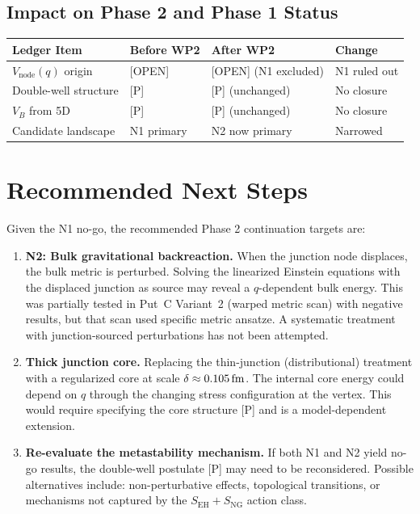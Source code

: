 \subsection{Impact on Phase 2 and Phase 1 Status}

\begin{center}
\begin{tabular}{llll}
\toprule
\textbf{Ledger Item} & \textbf{Before WP2} & \textbf{After WP2}
& \textbf{Change} \\
\midrule
$V_{\mathrm{node}}(q)$ origin & [OPEN] & [OPEN] (N1 excluded)
& N1 ruled out \\
Double-well structure & [P] & [P] (unchanged)
& No closure \\
$V_B$ from 5D & [P] & [P] (unchanged) & No closure \\
Candidate landscape & N1 primary & N2 now primary & Narrowed \\
\bottomrule
\end{tabular}
\end{center}

\section{Recommended Next Steps}
\label{sec:P2WP2:next}

Given the N1 no-go, the recommended Phase 2 continuation targets are:

\begin{enumerate}
    \item \textbf{N2: Bulk gravitational backreaction.} When the junction
          node displaces, the bulk metric is perturbed. Solving the
          linearized Einstein equations with the displaced junction as
          source may reveal a $q$-dependent bulk energy. This was
          partially tested in Put~C Variant~2 (warped metric scan) with
          negative results, but that scan used specific metric ansatze.
          A systematic treatment with junction-sourced perturbations
          has not been attempted.

    \item \textbf{Thick junction core.} Replacing the thin-junction
          (distributional) treatment with a regularized core at scale
          $\delta \approx 0.105\,\mathrm{fm}$. The internal core energy could
          depend on $q$ through the changing stress configuration at
          the vertex. This would require specifying the core structure
          [P] and is a model-dependent extension.

    \item \textbf{Re-evaluate the metastability mechanism.} If both
          N1 and N2 yield no-go results, the double-well postulate [P]
          may need to be reconsidered. Possible alternatives include:
          non-perturbative effects, topological transitions, or
          mechanisms not captured by the $S_{\mathrm{EH}} + S_{\mathrm{NG}}$
          action class.
\end{enumerate}

